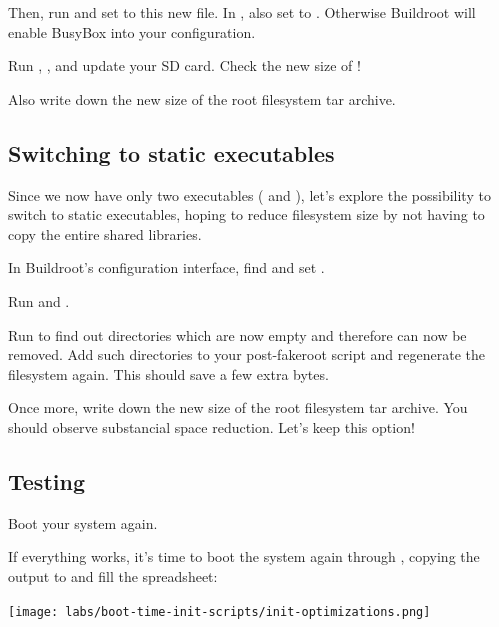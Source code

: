 Then, run  and set
 to this new file. In , also set  to . Otherwise
Buildroot will enable BusyBox  into your configuration.

Run , , and update your SD card.
Check the new size of !

Also write down the new size of the root filesystem tar archive.

\subsection{Switching to static executables}

Since we now have only two executables ( and
), let's explore the possibility to switch to static
executables, hoping to reduce filesystem size by not having to copy
the entire shared libraries.

In Buildroot's configuration interface, find and set
.

Run  and .

Run  to find out directories
which are now empty and therefore can now be removed. Add such directories to
your post-fakeroot script and regenerate the filesystem again.
This should save a few extra bytes.

Once more, write down the new size of the root filesystem tar archive.
You should observe substancial space reduction. Let's keep this option!

\subsection{Testing}
Boot your system again.

If everything works, it's time to boot the system again through
, copying the output to 
and fill the  spreadsheet:

\texttt{[image: labs/boot-time-init-scripts/init-optimizations.png]}
